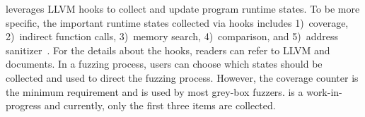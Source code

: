 \libfuzzer leverages LLVM hooks to collect and update program runtime states. To be more specific, the important runtime states collected via hooks includes 1)~coverage, 2)~indirect function calls, 3)~memory search, 4)~comparison, and 5)~address sanitizer~\cite{addresssanitizer}.
For the details about the hooks, readers can refer to LLVM and \libfuzzer documents.
In a fuzzing process, users can choose which states should be collected and used to direct the fuzzing process. However, the coverage counter is the minimum requirement and is used by most grey-box fuzzers.
\sys is a work-in-progress and currently, only the first three items are collected.

